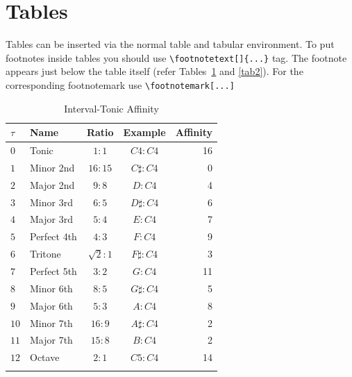\documentclass[sn-mathphys]{sn-jnl}%
\begin{document}
\section{Tables}\label{sec5}

Tables can be inserted via the normal table and tabular environment. To put
footnotes inside tables you should use \verb+\footnotetext[]{...}+ tag.
The footnote appears just below the table itself (refer Tables~\ref{tab1} and \ref{tab2}). 
For the corresponding footnotemark use \verb+\footnotemark[...]+

\begin{table}[h]
\begin{center}
\begin{minipage}{174pt}
\caption{Interval-Tonic Affinity}\label{tab1}%
\begin{tabular}{@{}llccr@{}}
\toprule
$\tau$ \footnotemark[1] & Name  & Ratio \footnotemark[2] & Example & Affinity  \\
\midrule
$0$ & Tonic & $1:1$ & $C4:C4$ & 16 \\
$1$ & Minor 2nd & $16:15$ & $C\sharp:C4$ & 0 \\
$2$ & Major 2nd & $9:8$ & $D:C4$ & 4 \\
$3$ & Minor 3rd & $6:5$ & $D\sharp:C4$ & 6 \\
$4$ & Major 3rd & $5:4$ & $E:C4$ & 7 \\
$5$ & Perfect 4th & $4:3$ & $F:C4$ & 9 \\
$6$ & Tritone \footnotemark[3] & $\sqrt{2}:1 $ & $F\sharp:C4$ & 3 \\
$7$ & Perfect 5th & $3:2$ & $G:C4$ & 11 \\
$8$ & Minor 6th & $8:5$ & $G\sharp:C4$ & 5 \\
$9$ & Major 6th & $5:3$ & $A:C4$ & 8 \\
$10$ & Minor 7th & $16:9$ & $A\sharp:C4$ & 2 \\
$11$ & Major 7th & $15:8$ & $B:C4$ & 2 \\
$12$ & Octave & $2:1$ & $C5:C4$ & 14 \\
\botrule
\end{tabular}
\end{minipage}
\end{center}
\end{table}
\end{document}
